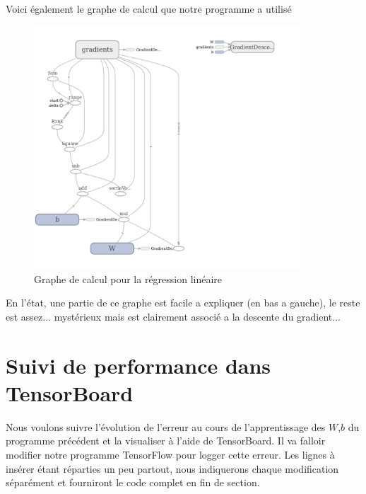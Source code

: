 Voici également le graphe de calcul que notre programme a utilisé
\begin{figure}[H]

\begin{center}
\includegraphics[width=10cm]{./figures/graphRegressionLineaire.png} 
\end{center}
\caption{Graphe de calcul pour la régression linéaire}
\end{figure}

En l'état, une partie de ce graphe est facile a expliquer (en bas a gauche), le reste est assez... mystérieux mais est clairement associé a la descente du gradient...

\section{Suivi de performance dans TensorBoard}
Nous voulons suivre l’évolution de l'erreur au cours de l'apprentissage des $W$,$b$ du programme précédent et la visualiser à l'aide de TensorBoard.
Il va falloir modifier notre programme TensorFlow pour logger cette erreur. Les lignes à insérer étant réparties un peu partout, nous indiquerons chaque modification séparément et fourniront le code complet en fin de section.

